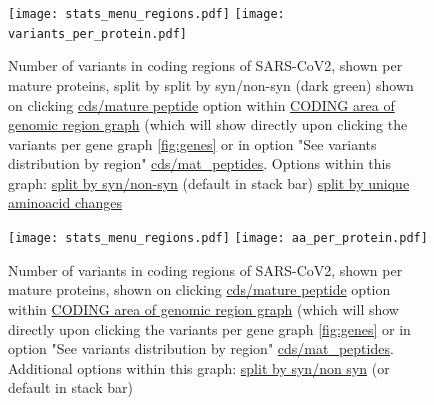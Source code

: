 \documentclass[a4paper, 10pt]{article}        %
\begin{document}
     \begin{figure}[!h]
     \centering
      \texttt{[image: stats\_menu\_regions.pdf]}
            \texttt{[image: variants\_per\_protein.pdf]}
     \caption{Number of variants in coding regions of SARS-CoV2, shown per mature proteins,  split by split by syn/non-syn (dark green) shown on clicking \underline{cds/mature peptide} option within \underline{CODING area of genomic region graph} (which will show directly upon clicking the variants per gene graph \ref{fig:genes} or in option "See variants distribution by region" {\color{blue}\underline{cds/mat\_peptides}}. Options within this graph: \underline{split by syn/non-syn} (default in stack bar)  \underline{split by unique aminoacid changes}
}
\label{fig:mp}
     \end{figure}


     \begin{figure}[!h]
     \centering
      \texttt{[image: stats\_menu\_regions.pdf]}
            \texttt{[image: aa\_per\_protein.pdf]}
     \caption{Number of variants in coding regions of SARS-CoV2, shown per mature proteins, shown on clicking \underline{cds/mature peptide} option within \underline{CODING area of genomic region graph} (which will show directly upon clicking the variants per gene graph \ref{fig:genes} or in option "See variants distribution by region" {\color{blue}\underline{cds/mat\_peptides}}. Additional options within this graph: \underline{split by syn/non syn} (or default in stack bar)
}
\label{fig:aa}
     \end{figure}
     
     



\end{document}
